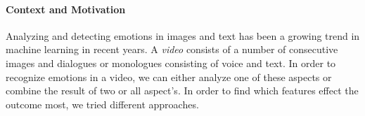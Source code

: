 %
%
%


\paragraph{Context and Motivation} Analyzing and detecting emotions in images and text has been a growing trend in machine learning in recent years. A \textit{video} consists of a number of consecutive images and dialogues or monologues consisting of voice and text. In order to recognize emotions in a video, we can either analyze one of these aspects or combine the result of two or all aspect's. In order to find which features effect the outcome most, we tried different approaches.



